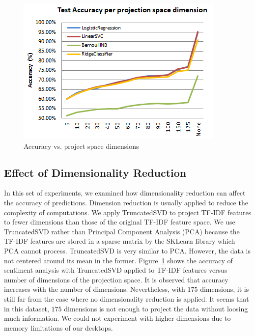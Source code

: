 \begin{figure}%
\centering
\includegraphics[width=1.0\columnwidth]{figures/dim_reduction_accuracy.png}%
\caption{Accuracy vs. project space dimensions}%
\label{fig:dim-reduction}%
\end{figure}

\subsection{Effect of Dimensionality Reduction}
\label{sec:dim-reduction}
In this set of experiments, we examined how dimensionality reduction can affect the accuracy of predictions. Dimension reduction is usually applied to reduce the complexity of computations. We apply TruncatedSVD to project TF-IDF features to fewer dimensions than those of the original TF-IDF feature space. We use TruncatedSVD rather than Principal Component Analysis (PCA) because the TF-IDF features are stored in a sparse matrix by the SKLearn library which PCA cannot process. TruncatedSVD is very similar to PCA. However, the data is not centered around its mean in the former.
Figure~\ref{fig:dim-reduction} shows the accuracy of sentiment analysis with TruncatedSVD applied to TF-IDF features versus number of dimensions of the projection space. It is observed that accuracy increases with the number of dimensions. Nevertheless, with $175$ dimensions, it is still far from the case where no dimensionality reduction is applied. It seems that in this dataset, $175$ dimensions is not enough to project the data without loosing much information. We could not experiment with higher dimensions due to memory limitations of our desktops.

